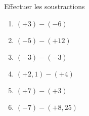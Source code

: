 
\begin{exercice}\label{exo2smath-0215}

    Effectuer les soustractions 
    \begin{multicols}{2}
        \begin{enumerate}
            \item
 $(+3)-(-6)$
\item
$ (-5)-(+12)$
\item
 $(-3)-(-3)$
\item
$ (+2,1)-(+4)$
\item
$ (+7)-(+3)$
\item
 $(-7)-(+8,25)$
        \end{enumerate}
    \end{multicols}

\end{exercice}

